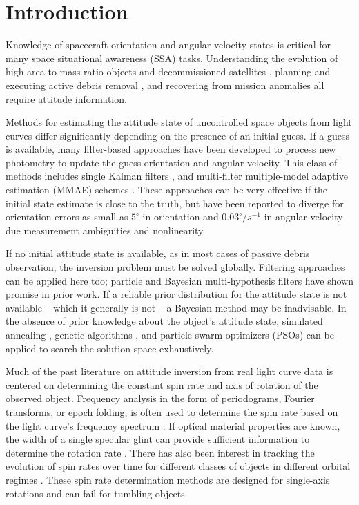 \documentclass[a4paper,twocolumn]{spaceDebrisC} %
\begin{document}
\section{Introduction}

Knowledge of spacecraft orientation and angular velocity states is critical for many space situational awareness (SSA) tasks. Understanding the evolution of high area-to-mass ratio objects \cite{frueh2014} and decommissioned satellites \cite{rachman2023}, planning and executing active debris removal \cite{bonnal2013}, and recovering from mission anomalies \cite{umansky2023} all require attitude information. 

Methods for estimating the attitude state of uncontrolled space objects from light curves differ significantly depending on the presence of an initial guess. If a guess is available, many filter-based approaches have been developed to process new photometry to update the guess orientation and angular velocity. This class of methods includes single Kalman filters \cite{burton2021two, gagnon2024, wetterer2009}, and multi-filter multiple-model adaptive estimation (MMAE) schemes \cite{linares2014space, dianetti2020}. These approaches can be very effective if the initial state estimate is close to the truth, but have been reported to diverge for orientation errors as small as $5^\circ$ in orientation and $0.03^\circ/s^{-1}$ in angular velocity \cite{gagnon2024} due measurement ambiguities and nonlinearity.

If no initial attitude state is available, as in most cases of passive debris observation, the inversion problem must be solved globally. Filtering approaches can be applied here too; particle \cite{linares2014particle, holzinger2014} and Bayesian multi-hypothesis filters \cite{burton2021two, cabrera2023} have shown promise in prior work. If a reliable prior distribution for the attitude state is not available -- which it generally is not -- a Bayesian method may be inadvisable. In the absence of prior knowledge about the object's attitude state, simulated annealing \cite{gagnon2024, clark2020}, genetic algorithms \cite{gagnon2024, piergentili2017, clark2020}, and particle swarm optimizers (PSOs) \cite{clark2020, clark2022, burton2024journal, burton2024scitech, gagnon2024} can be applied to search the solution space exhaustively.

Much of the past literature on attitude inversion from real light curve data is centered on determining the constant spin rate and axis of rotation of the observed object. Frequency analysis in the form of periodograms, Fourier transforms, or epoch folding, is often used to determine the spin rate based on the light curve's frequency spectrum \cite{silha2015, silha2021, isoletta2024, schildknecht2015, pittet2017, yanagisawa2012, koshkin2018}. If optical material properties are known, the width of a single specular glint can provide sufficient information to determine the rotation rate \cite{hinks2016}. There has also been interest in tracking the evolution of spin rates over time for different classes of objects in different orbital regimes \cite{koshkin2018, blacketer2022, karpov2016}. These spin rate determination methods are designed for single-axis rotations and can fail for tumbling objects.
\end{document}

